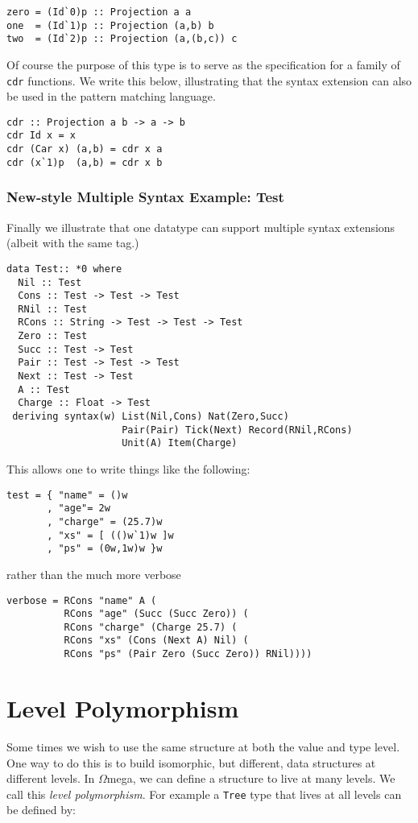 \documentclass[11pt,twoside]{article}
\newcommand{\om}{$\Omega$mega}
\begin{document}
\begin{verbatim}
zero = (Id`0)p :: Projection a a
one  = (Id`1)p :: Projection (a,b) b
two  = (Id`2)p :: Projection (a,(b,c)) c
\end{verbatim} 

Of course the purpose of this type is to serve as the specification for a family
of {\tt cdr} functions. We write this below, illustrating that the syntax extension
can also be used in the pattern matching language.

\begin{verbatim} 
cdr :: Projection a b -> a -> b
cdr Id x = x
cdr (Car x) (a,b) = cdr x a
cdr (x`1)p  (a,b) = cdr x b
\end{verbatim} 

\subsubsection{New-style Multiple Syntax Example: Test}

Finally we illustrate that one datatype can support multiple syntax extensions
(albeit with the same tag.)


\begin{verbatim}
data Test:: *0 where
  Nil :: Test
  Cons :: Test -> Test -> Test
  RNil :: Test
  RCons :: String -> Test -> Test -> Test
  Zero :: Test
  Succ :: Test -> Test
  Pair :: Test -> Test -> Test
  Next :: Test -> Test
  A :: Test
  Charge :: Float -> Test
 deriving syntax(w) List(Nil,Cons) Nat(Zero,Succ) 
                    Pair(Pair) Tick(Next) Record(RNil,RCons)
                    Unit(A) Item(Charge)
\end{verbatim}
This allows one to write things like the following:

\begin{verbatim}
test = { "name" = ()w
       , "age"= 2w
       , "charge" = (25.7)w
       , "xs" = [ (()w`1)w ]w
       , "ps" = (0w,1w)w }w
\end{verbatim}
rather than the much more verbose
\begin{verbatim}
verbose = RCons "name" A (
          RCons "age" (Succ (Succ Zero)) (
          RCons "charge" (Charge 25.7) (
          RCons "xs" (Cons (Next A) Nil) (
          RCons "ps" (Pair Zero (Succ Zero)) RNil))))
\end{verbatim}




\section{Level Polymorphism}
Some times we wish to use the same structure at both the value and type level.
One way to do this is to build isomorphic, but different, data structures
at different levels. In \om, we can define a structure to live
at many levels. We call this {\it level polymorphism}. For example
a {\tt Tree} type that lives at all levels can be defined by:
\end{document}
